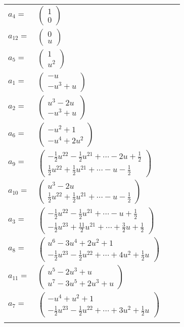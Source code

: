 \documentclass[1p]{elsarticle_modified}
\theoremstyle{definition}
\begin{document}
\begin{tabular}{m{7pt} m{180pt} m{7pt} m{180pt} }
\flushright $a_{4}=$&$\begin{pmatrix}1\\0\end{pmatrix}$ \\
\flushright $a_{12}=$&$\begin{pmatrix}0\\u\end{pmatrix}$ \\
\flushright $a_{5}=$&$\begin{pmatrix}1\\u^2\end{pmatrix}$ \\
\flushright $a_{1}=$&$\begin{pmatrix}- u\\- u^3+u\end{pmatrix}$ \\
\flushright $a_{2}=$&$\begin{pmatrix}u^3-2 u\\- u^3+u\end{pmatrix}$ \\
\flushright $a_{6}=$&$\begin{pmatrix}- u^2+1\\- u^4+2 u^2\end{pmatrix}$ \\
\flushright $a_{9}=$&$\begin{pmatrix}-\frac{1}{2} u^{22}-\frac{1}{2} u^{21}+\cdots-2 u+\frac{1}{2}\\\frac{1}{2} u^{22}+\frac{1}{2} u^{21}+\cdots- u-\frac{1}{2}\end{pmatrix}$ \\
\flushright $a_{10}=$&$\begin{pmatrix}u^3-2 u\\\frac{1}{2} u^{22}+\frac{1}{2} u^{21}+\cdots- u-\frac{1}{2}\end{pmatrix}$ \\
\flushright $a_{3}=$&$\begin{pmatrix}-\frac{1}{2} u^{22}-\frac{1}{2} u^{21}+\cdots- u+\frac{1}{2}\\-\frac{1}{2} u^{23}+\frac{11}{2} u^{21}+\cdots+\frac{3}{2} u+\frac{1}{2}\end{pmatrix}$ \\
\flushright $a_{8}=$&$\begin{pmatrix}u^6-3 u^4+2 u^2+1\\-\frac{1}{2} u^{23}-\frac{1}{2} u^{22}+\cdots+4 u^2+\frac{1}{2} u\end{pmatrix}$ \\
\flushright $a_{11}=$&$\begin{pmatrix}u^5-2 u^3+u\\u^7-3 u^5+2 u^3+u\end{pmatrix}$ \\
\flushright $a_{7}=$&$\begin{pmatrix}- u^4+u^2+1\\-\frac{1}{2} u^{23}-\frac{1}{2} u^{22}+\cdots+3 u^2+\frac{1}{2} u\end{pmatrix}$\\&\end{tabular}
\end{document}
